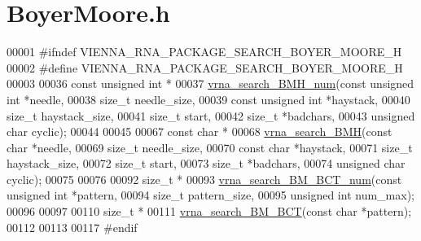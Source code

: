 \hypertarget{BoyerMoore_8h_source}{}\section{Boyer\+Moore.\+h}
\label{BoyerMoore_8h_source}

\begin{DoxyCode}
00001 \textcolor{preprocessor}{#ifndef VIENNA\_RNA\_PACKAGE\_SEARCH\_BOYER\_MOORE\_H}
00002 \textcolor{preprocessor}{#define VIENNA\_RNA\_PACKAGE\_SEARCH\_BOYER\_MOORE\_H}
00003 
00036 \textcolor{keyword}{const} \textcolor{keywordtype}{unsigned} \textcolor{keywordtype}{int} *
00037 \hyperlink{group__search__utils_ga8af89ab58905851f3dbd52624227d372}{vrna\_search\_BMH\_num}(\textcolor{keyword}{const} \textcolor{keywordtype}{unsigned} \textcolor{keywordtype}{int}  *needle,
00038                     \textcolor{keywordtype}{size\_t}              needle\_size,
00039                     \textcolor{keyword}{const} \textcolor{keywordtype}{unsigned} \textcolor{keywordtype}{int}  *haystack,
00040                     \textcolor{keywordtype}{size\_t}              haystack\_size,
00041                     \textcolor{keywordtype}{size\_t}              start,
00042                     \textcolor{keywordtype}{size\_t}              *badchars,
00043                     \textcolor{keywordtype}{unsigned} \textcolor{keywordtype}{char}       cyclic);
00044 
00045 
00067 \textcolor{keyword}{const} \textcolor{keywordtype}{char} *
00068 \hyperlink{group__search__utils_ga72574a7cf9786d825ce73f7f7748d3c4}{vrna\_search\_BMH}(\textcolor{keyword}{const} \textcolor{keywordtype}{char}    *needle,
00069                 \textcolor{keywordtype}{size\_t}        needle\_size,
00070                 \textcolor{keyword}{const} \textcolor{keywordtype}{char}    *haystack,
00071                 \textcolor{keywordtype}{size\_t}        haystack\_size,
00072                 \textcolor{keywordtype}{size\_t}        start,
00073                 \textcolor{keywordtype}{size\_t}        *badchars,
00074                 \textcolor{keywordtype}{unsigned} \textcolor{keywordtype}{char} cyclic);
00075 
00076 
00092 \textcolor{keywordtype}{size\_t} *
00093 \hyperlink{group__search__utils_gad315a442e099c86c5dbf6c1c7933223d}{vrna\_search\_BM\_BCT\_num}(\textcolor{keyword}{const} \textcolor{keywordtype}{unsigned} \textcolor{keywordtype}{int} *pattern,
00094                        \textcolor{keywordtype}{size\_t}             pattern\_size,
00095                        \textcolor{keywordtype}{unsigned} \textcolor{keywordtype}{int}       num\_max);
00096 
00097 
00110 \textcolor{keywordtype}{size\_t} *
00111 \hyperlink{group__search__utils_ga1d675ef5dcdcc8c33a1b79956a246697}{vrna\_search\_BM\_BCT}(\textcolor{keyword}{const} \textcolor{keywordtype}{char} *pattern);
00112 
00113 
00117 \textcolor{preprocessor}{#endif}
\end{DoxyCode}
